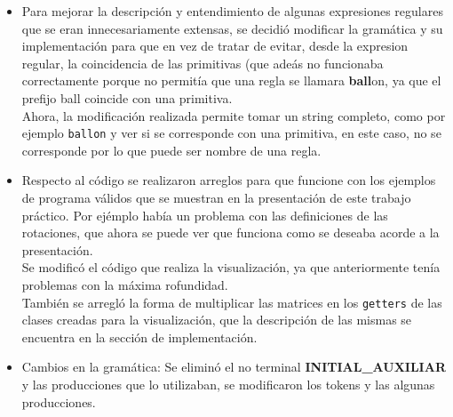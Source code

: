 \begin{itemize}
\item Para mejorar la descripci\'on y entendimiento de algunas expresiones regulares que se eran innecesariamente extensas, se decidi\'o modificar la gram\'atica y su implementaci\'on para que en vez de tratar de evitar, desde la expresion regular, la coincidencia de las primitivas (que ade\'as no funcionaba correctamente porque no permit\'ia que una regla se llamara \textbf{ball}on, ya que el prefijo ball coincide con una primitiva. \\
Ahora, la modificaci\'on realizada permite tomar un string completo, como por ejemplo \texttt{ballon} y ver si se corresponde con una primitiva, en este caso, no se corresponde por lo que puede ser nombre de una regla.

\item Respecto al c\'odigo se realizaron arreglos para que funcione con los ejemplos de programa v\'alidos que se muestran en la presentaci\'on de este trabajo pr\'actico. Por ej\'emplo hab\'ia un problema con las definiciones de las rotaciones, que ahora se puede ver que funciona como se deseaba acorde a la presentaci\'on.
\\
Se modific\'o el c\'odigo que realiza la visualizaci\'on, ya que anteriormente ten\'ia problemas con la m\'axima rofundidad.
\\
Tambi\'en se arregl\'o la forma de multiplicar las matrices en los \texttt{getters} de las clases creadas para la visualizaci\'on, que la descripci\'on de las mismas se encuentra en la secci\'on de implementaci\'on.


\item Cambios en la gram\'atica: Se elimin\'o el no terminal \textbf{INITIAL\_AUXILIAR} y las producciones que lo utilizaban, se modificaron los tokens y las algunas producciones.

\end{itemize}


